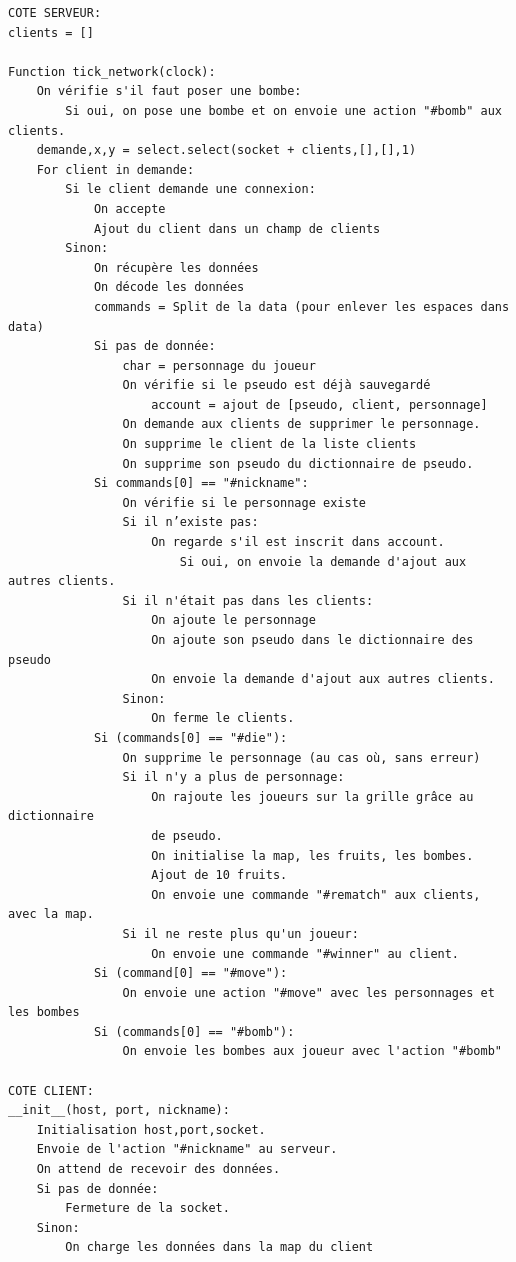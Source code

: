\documentclass[12pt]{article}
\begin{document}
    \label{code}
    \begin{verbatim}
COTE SERVEUR:
clients = []

Function tick_network(clock):
    On vérifie s'il faut poser une bombe:
        Si oui, on pose une bombe et on envoie une action "#bomb" aux clients.
    demande,x,y = select.select(socket + clients,[],[],1)
    For client in demande:
        Si le client demande une connexion:
            On accepte
            Ajout du client dans un champ de clients
        Sinon:
            On récupère les données
            On décode les données
            commands = Split de la data (pour enlever les espaces dans data)
            Si pas de donnée:
                char = personnage du joueur
                On vérifie si le pseudo est déjà sauvegardé
                    account = ajout de [pseudo, client, personnage]
                On demande aux clients de supprimer le personnage.
                On supprime le client de la liste clients
                On supprime son pseudo du dictionnaire de pseudo.
            Si commands[0] == "#nickname":
                On vérifie si le personnage existe
                Si il n’existe pas:
                    On regarde s'il est inscrit dans account.
                        Si oui, on envoie la demande d'ajout aux autres clients.
                Si il n'était pas dans les clients:
                    On ajoute le personnage
                    On ajoute son pseudo dans le dictionnaire des pseudo
                    On envoie la demande d'ajout aux autres clients.
                Sinon:
                    On ferme le clients.
            Si (commands[0] == "#die"):
                On supprime le personnage (au cas où, sans erreur)
                Si il n'y a plus de personnage:
                    On rajoute les joueurs sur la grille grâce au dictionnaire
                    de pseudo.
                    On initialise la map, les fruits, les bombes.
                    Ajout de 10 fruits.
                    On envoie une commande "#rematch" aux clients, avec la map.
                Si il ne reste plus qu'un joueur:
                    On envoie une commande "#winner" au client.
            Si (command[0] == "#move"):
                On envoie une action "#move" avec les personnages et les bombes
            Si (commands[0] == "#bomb"):
                On envoie les bombes aux joueur avec l'action "#bomb"

COTE CLIENT:
__init__(host, port, nickname):
    Initialisation host,port,socket.
    Envoie de l'action "#nickname" au serveur.
    On attend de recevoir des données.
    Si pas de donnée:
        Fermeture de la socket.
    Sinon:
        On charge les données dans la map du client


\end{verbatim}
\end{document}
